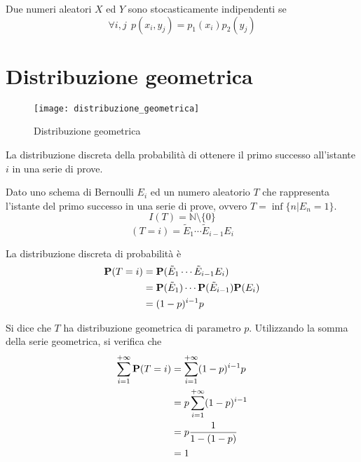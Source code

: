 \begin{definition}
  Due numeri aleatori \( X \) ed \( Y \) sono stocasticamente indipendenti se
  \[ \forall i,j ~~ p(x_i, y_j) = p_1(x_i) p_2(y_j) \]
\end{definition}


\section{Distribuzione geometrica} %
\begin{figure*}
  \texttt{[image: distribuzione\_geometrica]}
  \caption{Distribuzione geometrica}
\end{figure*}

\begin{definition}\label{def:distribuzione_geometrica}
  La distribuzione discreta della probabilità di ottenere il primo successo all'istante $i$ in una serie di prove.
\end{definition}

Dato uno schema di Bernoulli \( E_i \) ed un numero aleatorio \( T \) che rappresenta l'istante del primo successo in una serie di prove, ovvero \( T = \inf\{ n | E_n = 1 \} \).
\[ I(T) = \mathbb{N} \setminus \{ 0 \} \]
\[ (T = i) = \tilde{E}_1 \cdots \tilde{E}_{i-1} E_i \]

La distribuzione discreta di probabilità è
\begin{align*}
  \mathbf{P}(T = i) &= \mathbf{P}(\tilde{E}_1 \cdots \tilde{E}_{i-1} E_i) \\
  &= \mathbf{P}(\tilde{E}_1) \cdots \mathbf{P}(\tilde{E}_{i-1}) \mathbf{P}(E_i) \\
  &= (1-p)^{i-1} p
\end{align*}

Si dice che \( T \) ha distribuzione geometrica di parametro \( p \).
Utilizzando la somma della serie geometrica, si verifica che
\begin{align*}
  \sum_{i=1}^{+ \infty} \mathbf{P}(T = i) &= \sum_{i=1}^{+ \infty} (1-p)^{i-1} p \\
  &= p \sum_{i=1}^{+ \infty} (1-p)^{i-1}  \\
  &= p \frac{1}{1-(1-p)} \\
  &= 1
\end{align*}


